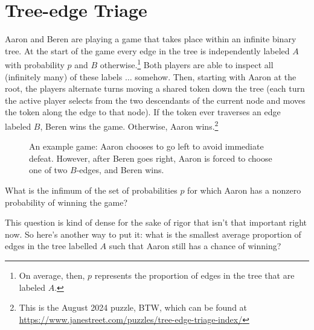 \documentclass{book}
\begin{document}
\chapter{Tree-edge Triage}\label{statement}
Aaron and Beren are playing a game that takes place within an infinite binary tree. At the start of the game every edge in the tree is independently labeled $A$ with probability $p$  and $B$ otherwise.\footnote{On average, then, $p$ represents the proportion of edges in the tree that are labeled $A$.} Both players are able to inspect all (infinitely many) of these labels $\ldots$ somehow. Then, starting with Aaron at the root, the players alternate turns moving a shared token down the tree (each turn the active player selects from the two descendants of the current node and moves the token along the edge to that node). If the token ever traverses an edge labeled $B$, Beren wins the game. Otherwise, Aaron wins.\footnote{This is the August 2024 puzzle, BTW, which can be found at \url{https://www.janestreet.com/puzzles/tree-edge-triage-index/}}

\begin{figure}[ht]
\centering

\caption{An example game: Aaron chooses to go left to avoid immediate defeat. However, after Beren goes right, Aaron is forced to choose one of two $B$-edges, and Beren wins.}
\label{exGame}
\end{figure}

\begin{question*}\label{infimum}
What is the infimum of the set of probabilities $p$ for which Aaron has a nonzero probability of winning the game?
\end{question*}
This question is kind of dense for the sake of rigor that isn't that important right now. So here's another way to put it: what is the smallest average proportion of edges in the tree labelled $A$ such that Aaron still has a chance of winning?
\end{document}

